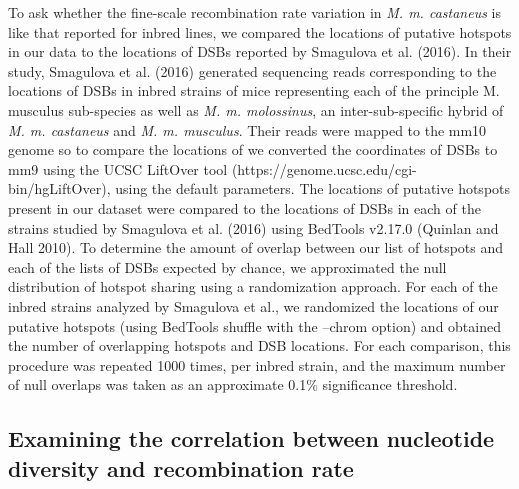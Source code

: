 	To ask whether the fine-scale recombination rate variation in \emph{M. m. castaneus} is like that reported for inbred lines, we compared the locations of putative hotspots in our data to the locations of DSBs reported by Smagulova et al. (2016). In their study, Smagulova et al. (2016) generated sequencing reads corresponding to the locations of DSBs in inbred strains of mice representing each of the principle M. musculus sub-species as well as \emph{M. m. molossinus}, an inter-sub-specific hybrid of \emph{M. m. castaneus} and \emph{M. m. musculus}. Their reads were mapped to the mm10 genome so to compare the locations of we converted the coordinates of DSBs to mm9 using the UCSC LiftOver tool (https://genome.ucsc.edu/cgi-bin/hgLiftOver), using the default parameters. The locations of putative hotspots present in our dataset were compared to the locations of DSBs in each of the strains studied by Smagulova et al. (2016) using BedTools v2.17.0 (Quinlan and Hall 2010). To determine the amount of overlap between our list of hotspots and each of the lists of DSBs expected by chance, we approximated the null distribution of hotspot sharing using a randomization approach. For each of the inbred strains analyzed by Smagulova et al., we randomized the locations of our putative hotspots (using BedTools shuffle with the –chrom option) and obtained the number of overlapping hotspots and DSB locations. For each comparison, this procedure was repeated 1000 times, per inbred strain, and the maximum number of null overlaps was taken as an approximate 0.1\% significance threshold.
 
\subsection{Examining the correlation between nucleotide diversity and recombination rate}

